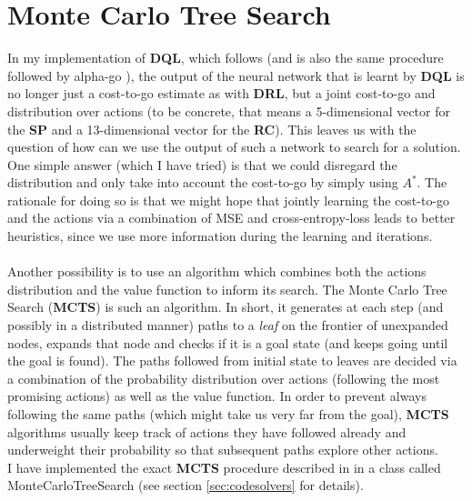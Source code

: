
\section{Monte Carlo Tree Search}

In my implementation of \textbf{DQL}, which follows \cite{https://doi.org/10.48550/arxiv.1805.07470} (and is also the same procedure followed by alpha-go \cite{AlphaGo}), the output of the neural network that is learnt by \textbf{DQL} is no longer just a cost-to-go estimate as with \textbf{DRL}, but a joint cost-to-go and distribution over actions (to be concrete, that means a 5-dimensional vector for the \textbf{SP} and a 13-dimensional vector for the \textbf{RC}). This leaves us with the question of how can we use the output of such a network to search for a solution. One simple answer (which I have tried) is that we could disregard the distribution and only take into account the cost-to-go by simply using $A^{*}$. The rationale for doing so is that we might hope that jointly learning the cost-to-go and the actions via a combination of MSE and cross-entropy-loss leads to better heuristics, since we use more information during the learning and iterations.
\\
\\
Another possibility is to use an algorithm which combines both the actions distribution and the value function to inform its search. The Monte Carlo Tree Search (\textbf{MCTS}) is such an algorithm. In short, it generates at each step (and possibly in a distributed manner) paths to a \textit{leaf} on the frontier of unexpanded nodes, expands that node and checks if it is a goal state (and keeps going until the goal is found). The paths followed from initial state to leaves are decided via a combination of the probability distribution over actions (following the most promising actions) as well as the value function. In order to prevent always following the same paths (which might take us very far from the goal), \textbf{MCTS} algorithms usually keep track of actions they have followed already and underweight their probability so that subsequent paths explore other actions.
\\
I have implemented the exact \textbf{MCTS} procedure described in \cite{https://doi.org/10.48550/arxiv.1805.07470} in a class called MonteCarloTreeSearch (see section \ref{sec:codesolvers} for details).




































